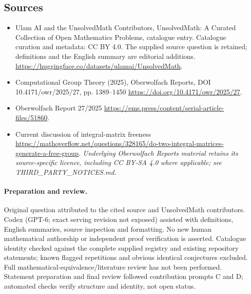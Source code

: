 \documentclass[11pt]{article}
\begin{document}
\subsection{Sources}
\begin{itemize}
\item[\hypertarget{source:statement:1}{S1}] Ulam AI and the UnsolvedMath Contributors, UnsolvedMath: A Curated Collection of Open Mathematics Problems, catalogue entry. Catalogue curation and metadata: CC BY 4.0. The supplied source question is retained; definitions and the English summary are editorial additions.
\url{https://huggingface.co/datasets/ulamai/UnsolvedMath}.
\item[\hypertarget{source:statement:2}{S2}] Computational Group Theory (2025), Oberwolfach Reports, DOI 10.4171/owr/2025/27, pp. 1389--1450
\url{https://doi.org/10.4171/owr/2025/27}.
\item[\hypertarget{source:statement:3}{S3}] Oberwolfach Report 27/2025
\url{https://ems.press/content/serial-article-files/51860}.
\item[\hypertarget{source:statement:4}{S4}] Current discussion of integral-matrix freeness
\url{https://mathoverflow.net/questions/328165/do-two-integral-matrices-generate-a-free-group}.
\textit{Underlying Oberwolfach Reports material retains its source-specific licence, including CC BY-SA 4.0 where applicable; see THIRD\_PARTY\_NOTICES.md.}
\end{itemize}
\paragraph{Preparation and review.}
Original question attributed to the cited source and UnsolvedMath contributors. Codex (GPT-6; exact serving revision not exposed) assisted with definitions, English summaries, source inspection and formatting. No new human mathematical authorship or independent proof verification is asserted. Catalogue identity checked against the complete supplied registry and existing repository statements; known flagged repetitions and obvious identical conjectures excluded. Full mathematical-equivalence/literature review has not been performed. Statement preparation and final review followed contribution prompts C and D; automated checks verify structure and identity, not open status.
\label{end:statement}
\end{document}
